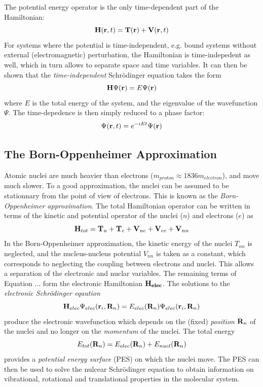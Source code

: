 The potential energy operator is the only time-dependent part of the Hamiltonian:
\begin{equation}
\mathbf{H}(\mathbf{r},t) = \mathbf{T}(\mathbf{r}) + \mathbf{V}(\mathbf{r},t)
\end{equation} 
\noindent For systems where the potential is time-independent, e.g. bound systems without external (electromagnetic) perturbation, the Hamiltonian is time-indepedent as well, which in turn allows to separate space and time variables. It can then be shown that the \emph{time-independent} Schrödinger equation takes the form
\begin{equation}
\mathbf{H}\Psi(\mathbf{r}) = E \Psi(\mathbf{r})
\end{equation}
\noindent where $E$ is the total energy of the system, and the eigenvalue of the wavefunction $\Psi$. The time-depedence is then simply reduced to a phase factor:
\begin{equation}
\Psi(\mathbf{r},t) = e^{-iEt} \Psi(\mathbf{r})
\end{equation}
\noindent 

\subsection{The Born-Oppenheimer Approximation}

Atomic nuclei are much heavier than electrons ($m_{proton} \approx 1836 m_{electron}$), and move much slower. To a good approximation, the nuclei can be assumed to be stationnary from the point of view of electrons. This is known as the \emph{Born-Oppenheimer approximation}. The total Hamiltonian operator can be written in terms of the kinetic and potential operator of the nuclei ($n$) and electrons ($e$) as
\begin{equation}
\mathbf{H}_{tot} = \mathbf{T}_n + \mathbf{T}_e + \mathbf{V}_{ne} + \mathbf{V}_{ee} + \mathbf{V}_{nn}
\end{equation}
\noindent In the Born-Oppenheimer approximation, the kinetic energy of the nuclei $T_{nn}$ is neglected, and the nucleus-nucleus potential $V_{nn}$ is taken as a constant, which corresponds to neglecting the coupling between electrons and nuclei. This allows a separation of the electronic and nuclar variables. The remaining terms of Equation ... form the electronic Hamiltonian $\mathbf{H_{elec}}$. The solutions to the \emph{electronic Schrödinger eqaution}
\begin{equation}
\mathbf{H}_{elec} \Psi_{elec}(\mathbf{r}_i, \mathbf{R}_n ) = E_{elec}(\mathbf{R}_n) \Psi_{elec}(\mathbf{r}_i, \mathbf{R}_n )
\end{equation}
\noindent produce the electronic wavefunction which depends on the (fixed) \emph{position} $\mathbf{R}_n$ of the nuclei and no longer on the \emph{momentum} of the nuclei. The total energy
\begin{equation}
E_{tot}(\mathbf{R}_n) = E_{elec}(\mathbf{R}_n) + E_{nucl}(\mathbf{R}_n)
\end{equation} 
\noindent provides a \emph{potential energy surface} (PES) on which the nuclei move. The PES can then be used to solve the nulcear Schrödinger equation to obtain information on vibrational, rotational and translational properties in the molecular system.

